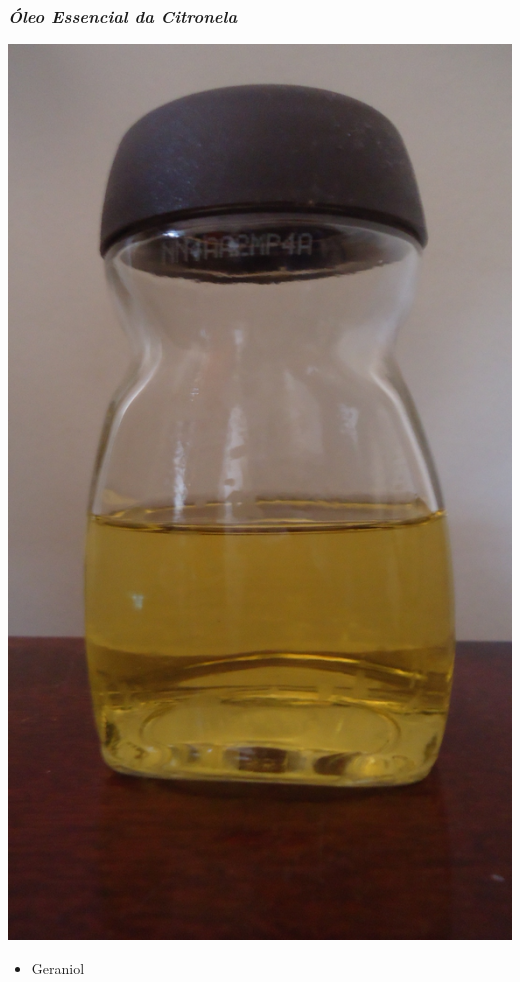 \documentclass[aspectratio=169]{beamer}
\begin{document}
\begin{frame}
\frametitle{\emph{Óleo Essencial da Citronela}}
	\begin{minipage}{0.49\textwidth}
		\includegraphics[scale=0.1]{imgs/oleo_essencial.jpg} 
	\end{minipage}
	\begin{minipage}{0.49\textwidth}
		\begin{itemize}
			\item Geraniol \pause

\end{itemize}
\end{minipage}
\end{frame}
\end{document}
